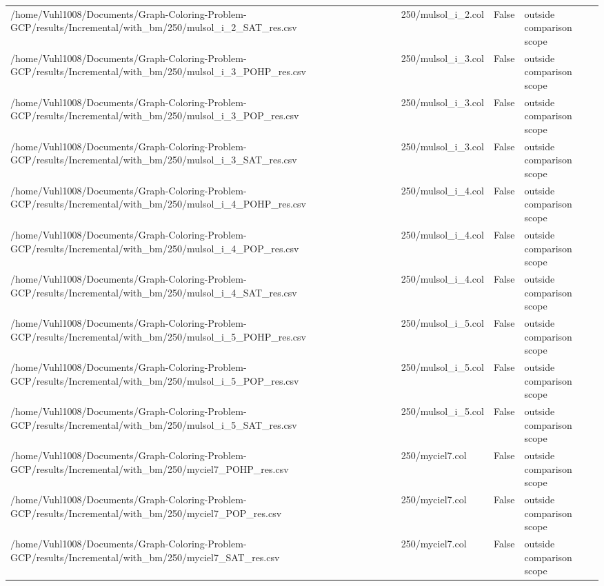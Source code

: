 \begin{table}[htbp]
\begin{tabular}{llll}
/home/Vuhl1008/Documents/Graph-Coloring-Problem-GCP/results/Incremental/with\_bm/250/mulsol\_i\_2\_SAT\_res.csv & 250/mulsol\_i\_2.col & False & outside comparison scope \\
/home/Vuhl1008/Documents/Graph-Coloring-Problem-GCP/results/Incremental/with\_bm/250/mulsol\_i\_3\_POHP\_res.csv & 250/mulsol\_i\_3.col & False & outside comparison scope \\
/home/Vuhl1008/Documents/Graph-Coloring-Problem-GCP/results/Incremental/with\_bm/250/mulsol\_i\_3\_POP\_res.csv & 250/mulsol\_i\_3.col & False & outside comparison scope \\
/home/Vuhl1008/Documents/Graph-Coloring-Problem-GCP/results/Incremental/with\_bm/250/mulsol\_i\_3\_SAT\_res.csv & 250/mulsol\_i\_3.col & False & outside comparison scope \\
/home/Vuhl1008/Documents/Graph-Coloring-Problem-GCP/results/Incremental/with\_bm/250/mulsol\_i\_4\_POHP\_res.csv & 250/mulsol\_i\_4.col & False & outside comparison scope \\
/home/Vuhl1008/Documents/Graph-Coloring-Problem-GCP/results/Incremental/with\_bm/250/mulsol\_i\_4\_POP\_res.csv & 250/mulsol\_i\_4.col & False & outside comparison scope \\
/home/Vuhl1008/Documents/Graph-Coloring-Problem-GCP/results/Incremental/with\_bm/250/mulsol\_i\_4\_SAT\_res.csv & 250/mulsol\_i\_4.col & False & outside comparison scope \\
/home/Vuhl1008/Documents/Graph-Coloring-Problem-GCP/results/Incremental/with\_bm/250/mulsol\_i\_5\_POHP\_res.csv & 250/mulsol\_i\_5.col & False & outside comparison scope \\
/home/Vuhl1008/Documents/Graph-Coloring-Problem-GCP/results/Incremental/with\_bm/250/mulsol\_i\_5\_POP\_res.csv & 250/mulsol\_i\_5.col & False & outside comparison scope \\
/home/Vuhl1008/Documents/Graph-Coloring-Problem-GCP/results/Incremental/with\_bm/250/mulsol\_i\_5\_SAT\_res.csv & 250/mulsol\_i\_5.col & False & outside comparison scope \\
/home/Vuhl1008/Documents/Graph-Coloring-Problem-GCP/results/Incremental/with\_bm/250/myciel7\_POHP\_res.csv & 250/myciel7.col & False & outside comparison scope \\
/home/Vuhl1008/Documents/Graph-Coloring-Problem-GCP/results/Incremental/with\_bm/250/myciel7\_POP\_res.csv & 250/myciel7.col & False & outside comparison scope \\
/home/Vuhl1008/Documents/Graph-Coloring-Problem-GCP/results/Incremental/with\_bm/250/myciel7\_SAT\_res.csv & 250/myciel7.col & False & outside comparison scope \\

\end{tabular}
\end{table}
